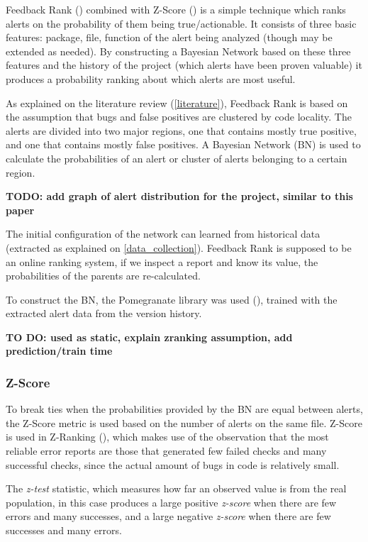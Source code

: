 \documentclass{article}
\begin{document}
Feedback Rank (\cite{correlation_exploitation}) combined with Z-Score (\cite{z-ranking}) is a simple technique which ranks alerts on the probability of them being true/actionable. It consists of three basic features: package, file, function of the alert being analyzed (though may be extended as needed).
By constructing a Bayesian Network based on these three features and the history of the project (which alerts have been proven valuable) it produces a probability ranking about which alerts are most useful.

As explained on the literature review (\cref{literature}), Feedback Rank is based on the assumption that bugs and false positives are clustered by code locality. The alerts are divided into two major regions, one that contains mostly true positive, and one that contains mostly false positives. A Bayesian Network (BN) is used to calculate the probabilities of an alert or cluster of alerts belonging to a certain region.

\textbf{TODO: add graph of alert distribution for the project, similar to this paper}

The initial configuration of the network can learned from historical data (extracted as explained on \cref{data_collection}). Feedback Rank is supposed to be an online ranking system, if we inspect a report and know its value, the probabilities of the parents are re-calculated.

To construct the BN, the Pomegranate library was used (\cite{pomegranate}), trained with the extracted alert data from the version history.

\textbf{TO DO: used as static, explain zranking assumption, add prediction/train time}


\subsubsection{Z-Score}
To break ties when the probabilities provided by the BN are equal between alerts, the Z-Score metric is used based on the number of alerts on the same file. Z-Score is used in Z-Ranking (\cite{z-ranking}), which makes use of the observation that the most reliable error reports are those that generated few failed checks and many successful checks, since the actual amount of bugs in code is relatively small. 

The \textit{z-test} statistic, which measures how far an observed value is from the real population, in this case produces a large positive \textit{z-score} when there are few errors and many successes, and a large negative \textit{z-score} when there are few successes and many errors.
\end{document}
